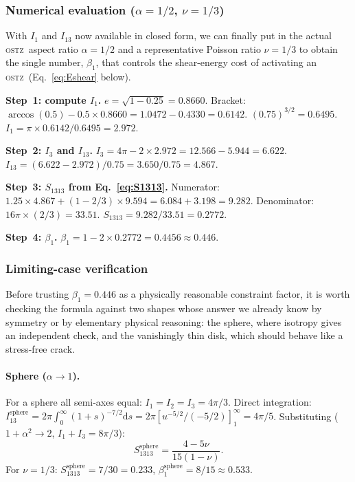 \documentclass[5p,sort&compress]{elsarticle}
\newcommand{\OSTZ}{\textsc{ostz}}
\begin{document}
\subsubsection{Numerical evaluation ($\alpha=1/2$, $\nu=1/3$)}
\label{sec:numeval}

With $I_1$ and $I_{13}$ now available in closed form, we can finally
put in the actual \OSTZ\ aspect ratio $\alpha=1/2$ and a
representative Poisson ratio $\nu=1/3$ to obtain the single number,
$\beta_1$, that controls the shear-energy cost of activating an
\OSTZ\ (Eq.~\eqref{eq:Eshear} below).

\textbf{Step~1: compute $I_1$.}
$e=\sqrt{1-0.25}=0.8660$.
Bracket: $\arccos(0.5)-0.5\times0.8660=1.0472-0.4330=0.6142$.
$(0.75)^{3/2}=0.6495$.
$I_1=\pi\times0.6142/0.6495=\mathbf{2.972}$.

\textbf{Step~2: $I_3$ and $I_{13}$.}
$I_3=4\pi-2\times2.972=12.566-5.944=\mathbf{6.622}$.
$I_{13}=(6.622-2.972)/0.75=3.650/0.75=\mathbf{4.867}$.

\textbf{Step~3: $S_{1313}$ from Eq.~\eqref{eq:S1313}.}
Numerator: $1.25\times4.867+(1-2/3)\times9.594
=6.084+3.198=9.282$.
Denominator: $16\pi\times(2/3)=33.51$.
$S_{1313}=9.282/33.51=\mathbf{0.2772}$.

\textbf{Step~4: $\beta_1$.}
$\beta_1=1-2\times0.2772=\mathbf{0.4456}\approx0.446$.

\subsubsection{Limiting-case verification}
\label{sec:limits}

Before trusting $\beta_1=0.446$ as a physically reasonable
constraint factor, it is worth checking the formula against two
shapes whose answer we already know by symmetry or by elementary
physical reasoning: the sphere, where isotropy gives an independent
check, and the vanishingly thin disk, which should behave like a
stress-free crack.

\paragraph{Sphere ($\alpha\to1$).}
For a sphere all semi-axes equal: $I_1=I_2=I_3=4\pi/3$.
Direct integration:
$I_{13}^\text{sphere}=2\pi\int_0^\infty(1+s)^{-7/2}\mathrm ds
=2\pi[u^{-5/2}/(-5/2)]_1^\infty=4\pi/5$.
Substituting ($1+\alpha^2\to2$, $I_1+I_3=8\pi/3$):
\begin{equation}
  S_{1313}^\text{sphere}=\frac{4-5\nu}{15(1-\nu)}.
  \label{eq:S1313sphere}
\end{equation}
For $\nu=1/3$: $S_{1313}^\text{sphere}=7/30=0.233$,
$\beta_1^\text{sphere}=8/15\approx0.533$.
\end{document}
